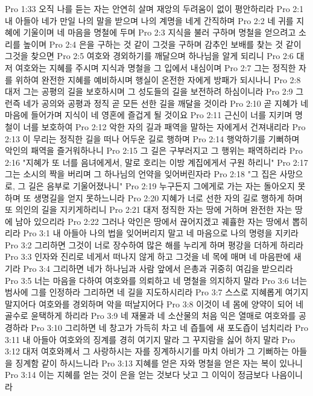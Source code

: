Pro 1:33  오직 나를 듣는 자는 안연히 살며 재앙의 두려움이 없이 평안하리라
Pro 2:1  내 아들아 네가 만일 나의 말을 받으며 나의 계명을 네게 간직하며
Pro 2:2  네 귀를 지혜에 기울이며 네 마음을 명철에 두며
Pro 2:3  지식을 불러 구하며 명철을 얻으려고 소리를 높이며
Pro 2:4  은을 구하는 것 같이 그것을 구하며 감추인 보배를 찾는 것 같이 그것을 찾으면
Pro 2:5  여호와 경외하기를 깨달으며 하나님을 알게 되리니
Pro 2:6  대저 여호와는 지혜를 주시며 지식과 명철을 그 입에서 내심이며
Pro 2:7  그는 정직한 자를 위하여 완전한 지혜를 예비하시며 행실이 온전한 자에게 방패가 되시나니
Pro 2:8  대저 그는 공평의 길을 보호하시며 그 성도들의 길을 보전하려 하심이니라
Pro 2:9  그런즉 네가 공의와 공평과 정직 곧 모든 선한 길을 깨달을 것이라
Pro 2:10  곧 지혜가 네 마음에 들어가며 지식이 네 영혼에 즐겁게 될 것이요
Pro 2:11  근신이 너를 지키며 명철이 너를 보호하여
Pro 2:12  악한 자의 길과 패역을 말하는 자에게서 건져내리라
Pro 2:13  이 무리는 정직한 길을 떠나 어두운 길로 행하며
Pro 2:14  행악하기를 기뻐하며 악인의 패역을 즐거워하나니
Pro 2:15  그 길은 구부러지고 그 행위는 패역하리라
Pro 2:16  "지혜가 또 너를 음녀에게서, 말로 호리는 이방 계집에게서 구원 하리니"
Pro 2:17  그는 소시의 짝을 버리며 그 하나님의 언약을 잊어버린자라
Pro 2:18  "그 집은 사망으로, 그 길은 음부로 기울어졌나니"
Pro 2:19  누구든지 그에게로 가는 자는 돌아오지 못하며 또 생명길을 얻지 못하느니라
Pro 2:20  지혜가 너로 선한 자의 길로 행하게 하며 또 의인의 길을 지키게하리니
Pro 2:21  대저 정직한 자는 땅에 거하며 완전한 자는 땅에 남아 있으리라
Pro 2:22  그러나 악인은 땅에서 끊어지겠고 궤휼한 자는 땅에서 뽑히리라
Pro 3:1  내 아들아 나의 법을 잊어버리지 말고 네 마음으로 나의 명령을 지키라
Pro 3:2  그리하면 그것이 너로 장수하여 많은 해를 누리게 하며 평강을 더하게 하리라
Pro 3:3  인자와 진리로 네게서 떠나지 않게 하고 그것을 네 목에 매며 네 마음판에 새기라
Pro 3:4  그리하면 네가 하나님과 사람 앞에서 은총과 귀중히 여김을 받으리라
Pro 3:5  너는 마음을 다하여 여호와를 의뢰하고 네 명철을 의지하지 말라
Pro 3:6  너는 범사에 그를 인정하라 그리하면 네 길을 지도하시리라
Pro 3:7  스스로 지혜롭게 여기지 말지어다 여호와를 경외하며 악을 떠날지어다
Pro 3:8  이것이 네 몸에 양약이 되어 네 골수로 윤택하게 하리라
Pro 3:9  네 재물과 네 소산물의 처음 익은 열매로 여호와를 공경하라
Pro 3:10  그리하면 네 창고가 가득히 차고 네 즙틀에 새 포도즙이 넘치리라
Pro 3:11  내 아들아 여호와의 징계를 경히 여기지 말라 그 꾸지람을 싫어 하지 말라
Pro 3:12  대저 여호와께서 그 사랑하시는 자를 징계하시기를 마치 아비가 그 기뻐하는 아들을 징계함 같이 하시느니라
Pro 3:13  지혜를 얻은 자와 명철을 얻은 자는 복이 있나니
Pro 3:14  이는 지혜를 얻는 것이 은을 얻는 것보다 낫고 그 이익이 정금보다 나음이니라
